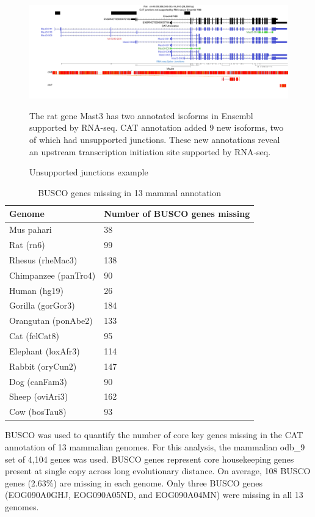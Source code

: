 \documentclass[fleqn,10pt]{wlscirep}
\begin{document}
\begin{figure}
\centering
\includegraphics[width=\textwidth,height=\textheight,keepaspectratio,angle=90]{mast3_example.pdf}
\caption{Unsupported junctions example}
The rat gene Mast3 has two annotated isoforms in Ensembl supported by RNA-seq. CAT annotation added 9 new isoforms, two of which had unsupported junctions. These new annotations reveal an upstream transcription initiation site supported by RNA-seq. 
\label{supp_fig:unsupported_junctions}
\end{figure}

\begin{table}
\centering
\begin{tabular}{|l|l|}
 \hline
Genome & Number of BUSCO genes missing \\ \hline
Mus pahari           & 38 \\  \hline
Rat (rn6)            & 99  \\ \hline
Rhesus (rheMac3)     & 138 \\ \hline
Chimpanzee (panTro4) & 90  \\ \hline
Human (hg19)         & 26  \\ \hline
Gorilla (gorGor3)    & 184 \\ \hline
Orangutan (ponAbe2)  & 133 \\ \hline
Cat (felCat8)        & 95  \\ \hline
Elephant (loxAfr3)   & 114 \\ \hline
Rabbit (oryCun2)     & 147 \\ \hline
Dog (canFam3)        & 90  \\ \hline
Sheep (oviAri3)      & 162 \\ \hline
Cow (bosTau8)        & 93 \\ \hline
\end{tabular}
\caption{BUSCO genes missing in 13 mammal annotation}
BUSCO was used to quantify the number of core key genes missing in the CAT annotation of 13 mammalian genomes. For this analysis, the mammalian odb\_9 set of 4,104 genes was used. BUSCO genes represent core housekeeping genes present at single copy across long evolutionary distance. On average, 108 BUSCO genes (2.63\%) are missing in each genome. Only three BUSCO genes (EOG090A0GHJ, EOG090A05ND, and EOG090A04MN) were missing in all 13 genomes.
\label{supp_table:busco}
\end{table}
\end{document}
